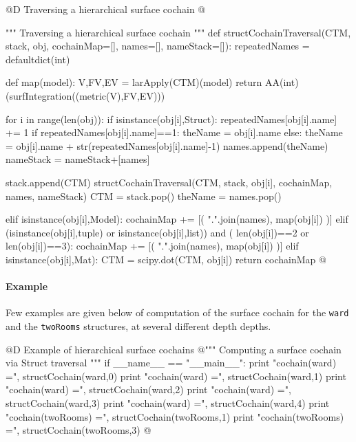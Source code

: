 \documentclass[11pt,oneside]{article}    %
\begin{document}
@D Traversing a hierarchical surface cochain
@{""" Traversing a hierarchical surface cochain """
def structCochainTraversal(CTM, stack, obj, cochainMap=[], names=[], nameStack=[]):
    repeatedNames = defaultdict(int)
    
    def map(model):
        V,FV,EV = larApply(CTM)(model)
        return AA(int)(surfIntegration((metric(V),FV,EV)))
    
    for i in range(len(obj)):
        if isinstance(obj[i],Struct):
            repeatedNames[obj[i].name] += 1
            if repeatedNames[obj[i].name]==1: theName = obj[i].name
            else: theName = obj[i].name + str(repeatedNames[obj[i].name]-1)
            names.append(theName)
            nameStack = nameStack+[names]
            
            stack.append(CTM) 
            structCochainTraversal(CTM, stack, obj[i], cochainMap, names, nameStack)
            CTM = stack.pop()
            theName = names.pop()
            
        elif isinstance(obj[i],Model): 
            cochainMap += [( ".".join(names), map(obj[i]) )]
        elif (isinstance(obj[i],tuple) or isinstance(obj[i],list)) and (
              len(obj[i])==2 or len(obj[i])==3):
            cochainMap += [( ".".join(names), map(obj[i]) )]
        elif isinstance(obj[i],Mat): 
            CTM = scipy.dot(CTM, obj[i])
    return cochainMap
@}

\paragraph{Example}

Few examples are given below of computation of the surface cochain for the \texttt{ward} and the \texttt{twoRooms} structures, at several different depth depths.

@D Example of hierarchical surface cochains
@{""" Computing a surface cochain via Struct traversal """
if __name__ == "__main__":
    print "\nsurface cochain(ward) =", structCochain(ward,0)
    print "\nsurface cochain(ward) =", structCochain(ward,1)
    print "\nsurface cochain(ward) =", structCochain(ward,2)
    print "\nsurface cochain(ward) =", structCochain(ward,3)
    print "\nsurface cochain(ward) =", structCochain(ward,4)
    print "\nsurface cochain(twoRooms) =", structCochain(twoRooms,1)
    print "\nsurface cochain(twoRooms) =", structCochain(twoRooms,3)
@}
\end{document}

